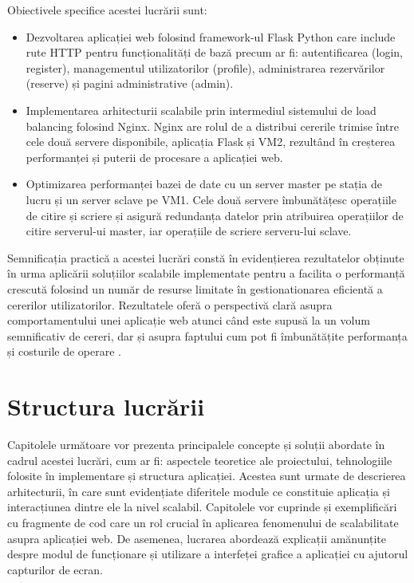 \documentclass[12pt, a4paper, oneside, romanian]{teza-upb}
\begin{document}
	Obiectivele specifice acestei lucrării sunt:
	\begin{itemize}
		\item Dezvoltarea aplicației web folosind framework-ul Flask Python care include rute HTTP pentru funcționalități de bază precum ar fi: autentificarea (login, register), managementul utilizatorilor (profile), administrarea rezervărilor (reserve) și pagini administrative (admin).
		
		\item Implementarea arhitecturii scalabile prin intermediul sistemului de load balancing folosind Nginx. Nginx are rolul de a distribui cererile trimise între cele două servere disponibile, aplicația Flask și VM2, rezultând în creșterea performanței și puterii de procesare a aplicației web.
		
		\item Optimizarea performanței bazei de date cu un server master pe stația de lucru și un server sclave pe VM1. Cele două servere îmbunătățesc operațiile de citire și scriere și asigură redundanța datelor prin atribuirea operațiilor de citire serverul-ui master, iar operațiile de scriere serveru-lui sclave.
	\end{itemize}
	
	Semnificația practică a acestei lucrări constă în evidențierea rezultatelor obținute în urma aplicării soluțiilor scalabile implementate pentru a facilita o performanță crescută folosind un număr de resurse limitate în gestionationarea eficientă a cererilor utilizatorilor. Rezultatele oferă o perspectivă clară asupra comportamentului unei aplicație web atunci când este supusă la un volum semnificativ de cereri, dar și asupra faptului cum pot fi îmbunătățite performanța și costurile de operare .
	
	\section{Structura lucrării}
	Capitolele următoare vor prezenta principalele concepte și soluții abordate în cadrul acestei lucrări, cum ar fi: aspectele teoretice ale proiectului, tehnologiile folosite în implementare și structura aplicației. Acestea sunt urmate de descrierea arhitecturii, în care sunt evidențiate diferitele module ce constituie aplicația și interacțiunea dintre ele la nivel scalabil. Capitolele vor cuprinde și exemplificări cu fragmente de cod care un rol crucial în aplicarea fenomenului de scalabilitate asupra aplicației web. De asemenea, lucrarea abordează explicații amănunțite despre modul de funcționare și utilizare a interfeței grafice a aplicației cu ajutorul capturilor de ecran.
	
\end{document}
